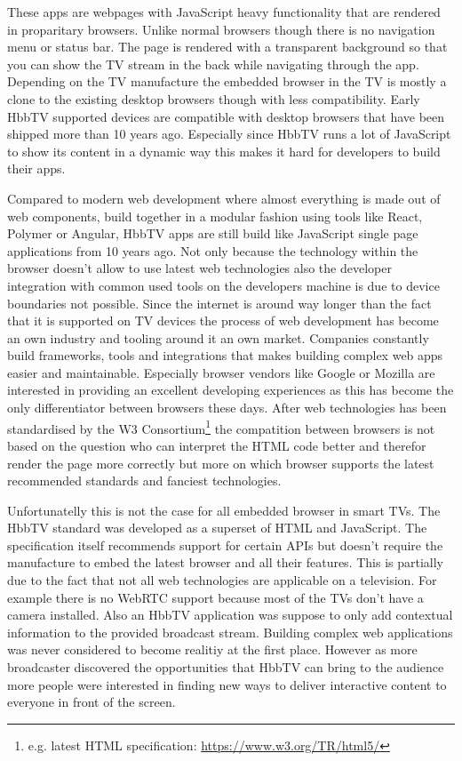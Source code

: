 These apps are webpages with JavaScript heavy functionality that are rendered in proparitary browsers. Unlike
normal browsers though there is no navigation menu or status bar. The page is rendered with a transparent background
so that you can show the TV stream in the back while navigating through the app. Depending on the TV manufacture
the embedded browser in the TV is mostly a clone to the existing desktop browsers though with less compatibility.
Early HbbTV supported devices are compatible with desktop browsers that have been shipped more than 10 years ago.
Especially since HbbTV runs a lot of JavaScript to show its content in a dynamic way this makes it hard for
developers to build their apps.

Compared to modern web development where almost everything is made out of web components, build together in a
modular fashion using tools like React, Polymer or Angular, HbbTV apps are still build like JavaScript single
page applications from 10 years ago. Not only because the technology within the browser doesn't allow to use
latest web technologies also the developer integration with common used tools on the developers machine is due
to device boundaries not possible. Since the internet is around way longer than the fact that it is supported on
TV devices the process of web development has become an own industry and tooling around it an own market.
Companies constantly build frameworks, tools and integrations that makes building complex web apps easier and
maintainable. Especially browser vendors like Google or Mozilla are interested in providing an excellent
developing experiences as this has become the only differentiator between browsers these days. After web
technologies has been standardised by the W3 Consortium\footnote{e.g. latest HTML specification: \url{https://www.w3.org/TR/html5/}}
the compatition between browsers is not based on the question who can interpret the HTML code better and therefor
render the page more correctly but more on which browser supports the latest recommended standards and fanciest
technologies.

Unfortunatelly this is not the case for all embedded browser in smart TVs. The HbbTV standard was developed as
a superset of HTML and JavaScript. The specification itself recommends support for certain APIs but doesn't
require the manufacture to embed the latest browser and all their features. This is partially due to the fact
that not all web technologies are applicable on a television. For example there is no WebRTC support because
most of the TVs don't have a camera installed. Also an HbbTV application was suppose to only add contextual
information to the provided broadcast stream. Building complex web applications was never considered to become
realitiy at the first place. However as more broadcaster discovered the opportunities that HbbTV can bring to
the audience more people were interested in finding new ways to deliver interactive content to everyone in
front of the screen.

